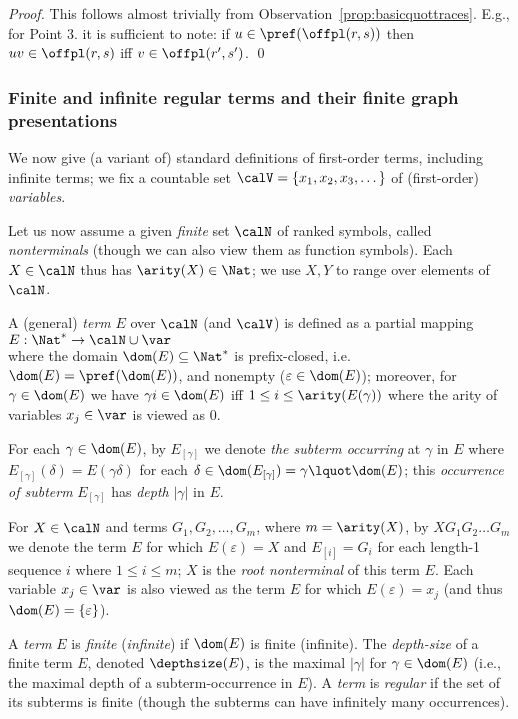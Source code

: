 \documentclass[12pt]{article}
\begin{document}
\begin{proof}
This follows almost trivially from 
Observation~\ref{prop:basicquottraces}. 
E.g., for Point 3. it is sufficient to note:
if $u\in\pref(\offpl(r,s))$ then 
$uv\in \offpl(r,s)$ iff
$v\in\offpl(r',s')$.  
\qed
\end{proof}



\subsubsection*{Finite and infinite regular terms and their
finite graph presentations} 

We now give (a variant of) standard definitions of first-order terms,
including infinite terms;
we fix a countable set 
$\calV=\{x_1,x_2,x_3,\dots\}$ of (first-order) \emph{variables}.

Let us now assume  a given \emph{finite} set $\calN$ of 
ranked symbols, called \emph{nonterminals}
(though we can also view them as function symbols).
Each $X\in \calN$ thus has  $\arity(X)\in\Nat$; we use $X,Y$ to range
over elements of $\calN$.

A (general) \emph{term} $E$ over $\calN$ (and $\calV$) is defined as a
partial mapping $E:\Nat^*\rightarrow \calN\cup\var$
\\
where  
the domain $\dom(E)\subseteq \Nat^*$ is prefix-closed,
i.e. $\dom(E)=\pref(\dom(E))$, and nonempty ($\varepsilon\in\dom(E)$);
moreover, for $\gamma\in\dom(E)$ we have 
$\gamma i\in \dom(E)$ iff $1\leq i\leq
\arity(E(\gamma))$ where the arity of variables $x_j\in\var$ is viewed as
$0$.

For each $\gamma\in\dom(E)$, by $E_{[\gamma]}$ we denote
\emph{the subterm occurring} at $\gamma$ in $E$ where
$E_{[\gamma]}(\delta)=E(\gamma\delta)$ for each 
$\delta\in\dom(E_{[\gamma]})=\gamma\lquot \dom(E)$;
this \emph{occurrence of subterm} $E_{[\gamma]}$ has \emph{depth}
$|\gamma|$ in $E$. 

For $X\in\calN$ and terms $G_1,G_2,\dots, G_m$, where 
$m=\arity(X)$, by $XG_1G_2\dots G_m$ we denote the term $E$ for which
$E(\varepsilon)=X$ and $E_{[i]}=G_i$ for each length-1 sequence $i$
where $1\leq i\leq m$; $X$ is the \emph{root nonterminal} of this term
$E$. Each variable $x_j\in\var$ is also viewed as
the term $E$ for which $E(\varepsilon)=x_j$ 
(and thus $\dom(E)=\{\varepsilon\}$). 

A \emph{term} $E$ is \emph{finite} (\emph{infinite})
if $\dom(E)$ is finite (infinite).
The \emph{depth-size} of a finite term $E$, denoted $\depthsize(E)$,
is the maximal $|\gamma|$ for $\gamma\in\dom(E)$
(i.e., the maximal depth of a subterm-occurrence in $E$).
A \emph{term} is \emph{regular} if the set of its subterms
is finite 
(though the subterms can have infinitely many occurrences).
\end{document}

